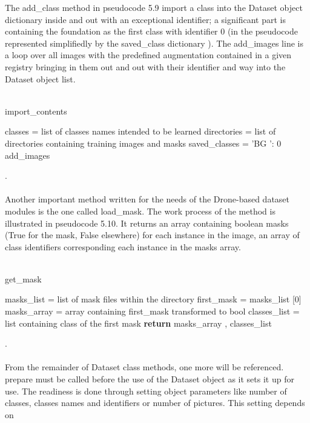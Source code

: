 The add\_class method in pseudocode 5.9 import a class into the Dataset object dictionary  inside and out with an exceptional identifier; a significant part is containing 
the foundation as the first class with identifier 0 (in the pseudocode represented simplifiedly by the saved\_class dictionary ). The add\_images line is a loop over all 
images with the predefined augmentation contained in a given registry bringing in them out and out with their identifier and way into the Dataset object list.
\\
\\
\begin{algorithm}[H]
  \caption{import\_contents}
  \SetAlgoLined
  \DontPrintSemicolon
   classes = list of classes names intended to be learned\;
  directories = list of directories containing training images and
  masks\;
  saved\_classes = {’BG ’: 0}\;
   {add\_images\;}
  
\end{algorithm}
.\\
\\ 
Another important method written for the needs of the Drone-based dataset modules is
the one called load\_mask. The work process of the method is illustrated in pseudocode
5.10. It returns an array containing boolean masks (True for the mask, False elsewhere)
for each instance in the image, an array of class identifiers corresponding each instance in the masks array.
\\
\\
\begin{algorithm}[H]
  \caption{get\_mask}
  \SetAlgoLined
  \DontPrintSemicolon
masks\_list = list of mask files within the directory\;
first\_mask = masks\_list [0]\;
masks\_array = array containing first\_mask transformed to bool\;
classes\_list = list containing class of the first mask\;
\textbf{return} masks\_array , classes\_list\; 
\end{algorithm}
.\\
\\
From the remainder of Dataset class methods, one more will be referenced. prepare must be called before the use of the Dataset object as it sets it up for use. 
The readiness is done through setting object parameters like number of classes, classes names and identifiers or number of pictures. This setting depends on 
